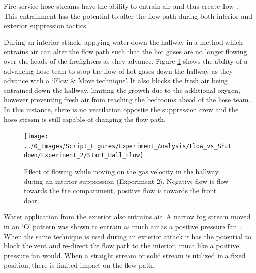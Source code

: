 \documentclass[12pt,oneside]{book}
\begin{document}
Fire service hose streams have the ability to entrain air and thus create flow \cite{Weinchenk_airentrainment}. This entrainment has the potential to alter the flow path during both interior and exterior suppression tactics. 

During an interior attack, applying water down the hallway in a method which entrains air can alter the flow path such that the hot gases are no longer flowing over the heads of the firefighters as they advance. Figure \ref{fig:flow_path_effect_TC_hallwayflow} shows the ability of a advancing hose team to stop the flow of hot gases down the hallway as they advance with a `Flow \& Move technique'. It also blocks the fresh air being entrained down the hallway, limiting the growth due to the additional oxygen, however preventing fresh air from reaching the bedrooms ahead of the hose team. In this instance, there is no ventilation opposite the suppression crew and the hose stream is still capable of changing the flow path.

\begin{figure}[H]
\centering
\texttt{[image: ../0\_Images/Script\_Figures/Experiment\_Analysis/Flow\_vs\_Shutdown/Experiment\_2/Start\_Hall\_Flow]}
\caption[Hallway Flow - Flow \& Move Interior Attack]{Effect of flowing while moving on the gas velocity in the hallway during an interior suppression (Experiment 2). Negative flow is flow towards the fire compartment, positive flow is towards the front door.}
\label{fig:flow_path_effect_TC_hallwayflow}
\end{figure}

Water application from the exterior also entrains air. A narrow fog stream moved in an `O' pattern was shown to entrain as much air as a positive pressure fan \cite{Weinchenk_airentrainment}. When the same technique is used during an exterior attack it has the potential to block the vent and re-direct the flow path to the interior, much like a positive pressure fan would. When a straight stream or solid stream is utilized in a fixed position, there is limited impact on the flow path. 
\end{document}
